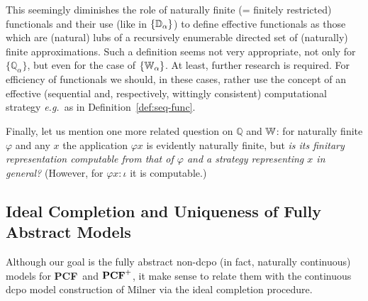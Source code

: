 \documentclass[fleqn]{LMCS}
\theoremstyle{plain}\newtheorem{satz}[thm]{Satz}
\theoremstyle{plain}\newtheorem{hyp}[thm]{Hypothesis}
\theoremstyle{plain}\newtheorem{hyps}[thm]{Hypotheses}
\theoremstyle{definition}\newtheorem{note}[thm]{Note}
\def\eg{{\em e.g.}}
\newcommand{\setof}[1]{\{#1\}}
\newcommand{\bbQ}{\mathbb{Q}}
\newcommand{\PCF}{\mbox{\bf PCF}}
\newcommand{\?}{\mbox{?}}
\begin{document}
This seemingly diminishes the role of naturally finite 
(= finitely restricted) functionals and their use 
(like in $\setof{\bbD_\alpha}$)
to define effective functionals as those 
which are (natural) lubs of a  recursively enumerable directed set of 
(naturally) finite approximations. 
Such a definition seems not very appropriate, 
not only for $\setof{\bbQ_\alpha}$, but even for the case of $\setof{\bbW_\alpha}$. 
At least, further research is required.
For efficiency of functionals we should, in these cases, rather use the concept 
of an effective (sequential and, respectively, wittingly consistent) computational strategy 
\eg\ as in Definition~\ref{def:seq-func}. 

Finally, let us mention one more related question on $\bbQ$ and $\mathbb{W}$: 
for naturally finite $\varphi$ and any $x$ the application $\varphi x$ is 
evidently naturally finite, but 
\emph{is its finitary representation computable from that of $\varphi$ and a strategy 
representing $x$ in general?} (However, for $\varphi x:\iota$ it is computable.)


\subsection{Ideal Completion and Uniqueness of Fully Abstract Models}
\label{sec:completion}


\noindent
Although our goal is the fully abstract non-dcpo (in fact, naturally continuous) 
models for \PCF\ and $\PCF^+$, it make sense 
to relate them with the continuous dcpo model construction of Milner \cite{Milner77} 
via the ideal completion procedure. 

\medskip
\end{document}
